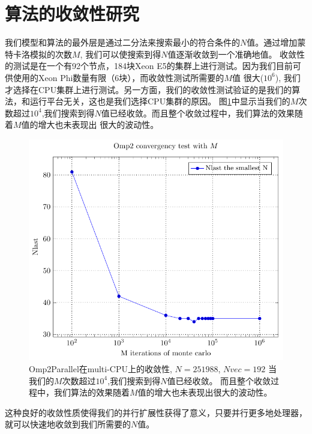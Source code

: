 \section{算法的收敛性研究} %
\label{sec:converge}
我们模型和算法的最外层是通过二分法来搜索最小的符合条件的$N$值。通过增加蒙特卡洛模拟的次数$M$, 我们可以使搜索到得$N$值逐渐收敛到一个准确地值。
收敛性的测试是在一个有92个节点，184块Xeon E5的集群上进行测试。因为我们目前可供使用的Xeon Phi数量有限（6块），而收敛性测试所需要的$M$值
很大($10^6$), 我们才选择在CPU集群上进行测试。另一方面，我们的收敛性测试验证的是我们的算法，和运行平台无关，这也是我们选择CPU集群的原因。
图\ref{fig:converge}中显示当我们的$M$次数超过$10^4$,我们搜索到得$N$值已经收敛。而且整个收敛过程中，我们算法的效果随着$M$值的增大也未表现出
很大的波动性。
\begin{figure}[!t]
   \centering
   \includegraphics[width=\textwidth]{chap5/Figures/bs-converge.pdf}
   \caption{Omp2Parallel在multi-CPU上的收敛性, $N=251988$, $Nvec=192$ 当我们的$M$次数超过$10^4$,我们搜索到得$N$值已经收敛。
	   而且整个收敛过程中，我们算法的效果随着$M$值的增大也未表现出很大的波动性。}
   \label{fig:converge}
\end{figure}
这种良好的收敛性质使得我们的并行扩展性获得了意义，只要并行更多地处理器，就可以快速地收敛到我们所需要的$N$值。










